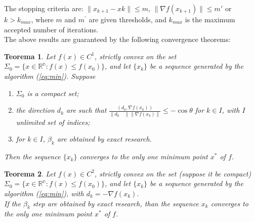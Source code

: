 \documentclass[a4paper,12pt]{report}
\begin{document}
The stopping criteria are: $\parallel x_{k+1}-x{k}\parallel \leq m$, $\parallel \nabla f(x_{k+1})\parallel \leq m\prime$ or $k>k_{max}$, where $m$ and $m^{\prime}$ are given thresholds, and $k_{max}$ is the maximum accepted number of iterations.\\
The above results are guaranteed by the following convergence theorems:
\newtheorem{teo}{Teorema}
\begin{teo}
Let $f(x)\in C^{1}$, strictly convex on the set  $\Sigma_{0}=\{x\in\mathbb{R^{n}}:f(x)\leq f(x_{0})\}$, and let $\{x_{k}\}$ be a sequence generated by the algorithm (\ref{eq:min}). Suppose
\begin{enumerate}
\item $\Sigma_{0}$ is a compact set;
\item the direction $d_{k}$ are  such that $\frac{(d_{k},\nabla f(x_{k}))}{\parallel d_{k}\quad \parallel \parallel \nabla f(x_{k})\parallel}\leq - \cos \theta$ for $k\in \textit{I}$, with $\textit{I}$ unlimited set of indices;
\item for $k\in \textit{I}$, $\beta_{k}$ are obtained by exact research.
\end{enumerate}
Then the sequence $\{x_{k}\}$ converges to the only one minimum point $x^{*}$ of $f$.
\end{teo}
\begin{teo}
Let $f(x)\in C^{2}$,  strictly convex on the set (suppose it be compact) $\Sigma_{0}=\{x\in\mathbb{R^{n}}:f(x)\leq f(x_{0})\}$, and let $\{x_{k}\}$  be a sequence generated by the algorithm (\ref{eq:min}), with $d_{k}=-\nabla f(x_{k})$.\\
If the  $\beta_{k}$ step are obtained by exact research, than the sequence $x_{k}$ converges to the only one minimum point $x^{*}$ of $f$.
\end{teo}
\end{document}

